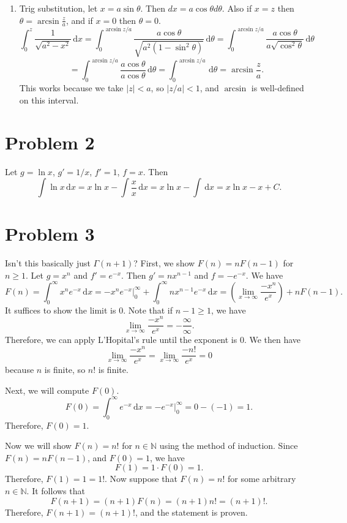 \documentclass[11pt, letterpaper]{article}
\begin{document}
\begin{enumerate}
\[		.\]
		U-substitution, $u=\sinh x$, $du=\cosh x$.
		\[
			\int_{0}^{z} \cosh^3 x \,\mathrm{d} x=\int_{0}^{z} \left( 1+\sinh^2x \right) \cosh x \,\mathrm{d} x=\int_{0}^{\sinh z} 1+u^2 \,\mathrm{d} u=\left( u+\frac{1}{3} u^3 \right)\bigg|_0^{\sinh z}
		\]
		\[
			=\sinh z+ \frac{1}{3} \sinh^3 z
		.\]
	\item Trig substitution, let $x=a\sin \theta $. Then $dx=a \cos \theta d \theta $. Also if $x=z$ then $\theta = \arcsin \frac{z}{a} $, and if $x=0$ then $\theta =0$.
		\[
			\int_{0}^{z} \frac{1}{\sqrt{a^2-x^2} }  \,\mathrm{d} x=\int_{0}^{\arcsin z/a} \frac{a \cos \theta }{\sqrt{a^2\left( 1-\sin^2 \theta  \right) } }  \,\mathrm{d} \theta =\int_{0}^{\arcsin z/a} \frac{a \cos \theta }{a\sqrt{\cos ^2\theta } }  \,\mathrm{d} \theta 
		\]
		\[
			=\int_{0}^{\arcsin z/a} \frac{a \cos \theta }{a \cos \theta }  \,\mathrm{d} \theta =\int_{0}^{\arcsin z/a}  \,\mathrm{d} \theta =\arcsin \frac{z}{a} 
		.\]
		This works because we take $\left| z \right| <a$, so $\left| z/a \right| <1$, and $\arcsin $ is well-defined on this interval.
\end{enumerate}
\section*{Problem 2}
Let $g=\ln x$, $g'=1/x$, $f'=1$, $f=x$. Then
\[
	\int \ln x \,\mathrm{d} x=x \ln x-\int \frac{x}{x}  \,\mathrm{d} x=x \ln x-\int  \,\mathrm{d} x=x \ln x-x+C
.\]
\section*{Problem 3}
Isn't this basically just $\Gamma (n+1)$? First, we show $F(n)=nF(n-1)$ for $n\geq 1$. Let $g=x^n$ and $f'=e^{-x} $. Then $g'=nx^{n-1} $ and $f=-e^{-x} $. We have
\[
	F(n)=\int_{0}^{\infty } x^ne^{-x}  \,\mathrm{d} x=-x^ne^{-x}\bigg|_0^{\infty }+\int_{0}^{\infty } nx^{n-1} e^{-x}  \,\mathrm{d} x=\left( \lim_{x \to \infty} \frac{-x^n }{e^x}  \right) +nF(n-1)
.\]
It suffices to show the limit is 0. Note that if $n-1\geq 1$, we have
\[
	\lim_{x \to \infty} \frac{-x^n }{e^{x} } =-\frac{\infty }{\infty } 
.\]
Therefore, we can apply L'Hopital's rule until the exponent is $0$. We then have
\[
	\lim_{x \to \infty} \frac{-x^n }{e^x} =\lim_{x \to \infty} \frac{-n!}{e^x} =0
\]
because $n$ is finite, so $n!$ is finite.

Next, we will compute $F(0)$.
\[
	F(0)=\int_{0}^{\infty } e^{-x}  \,\mathrm{d} x=-e^{-x} \bigg|_0^{\infty }=0-(-1)=1
.\]
Therefore, $F(0)=1$.

Now we will show $F(n)=n!$ for $n\in\mathbb{N} $ using the method of induction. Since $F(n)=nF(n-1)$, and $F(0)=1$, we have
\[
	F(1)=1\cdot F(0)=1
.\]
Therefore, $F(1)=1=1!$. Now suppose that $F(n)=n!$ for some arbitrary $n\in\mathbb{N} $. It follows that
\[
	F(n+1)=(n+1)F(n)=(n+1)n! =(n+1)!
.\]
Therefore, $F(n+1)=(n+1)!$, and the statement is proven.
\end{document}
